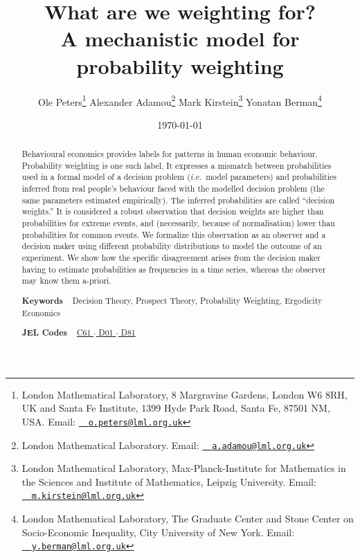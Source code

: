 \documentclass[a4paper, 12pt]{article}
\title{What are we weighting for? \\
{\small A mechanistic model for probability weighting}}
\author{
Ole Peters\footnote{London Mathematical Laboratory, 8 Margravine Gardens, London W6 8RH, UK and Santa Fe Institute, 1399 Hyde Park Road, Santa Fe, 87501 NM, USA. Email: \href{mailto:o.peters@lml.org.uk}{~\Letter~\texttt{o.peters@lml.org.uk}}} \;
Alexander Adamou\footnote{London Mathematical Laboratory. Email: \href{mailto:a.adamou@lml.org.uk}{~\Letter~\texttt{a.adamou@lml.org.uk}}} \;
Mark Kirstein\footnote{London Mathematical Laboratory, Max-Planck-Institute for Mathematics in the Sciences and Institute of Mathematics, Leipzig University. Email: \href{mailto:m.kirstein@lml.org.uk}{~\Letter~\texttt{m.kirstein@lml.org.uk}}} \;
Yonatan Berman\footnote{London Mathematical Laboratory, The Graduate Center and Stone Center on Socio-Economic Inequality, City University of New York. Email: \href{mailto:y.berman@lml.org.uk}{~\Letter~\texttt{y.berman@lml.org.uk}}} 
}
\date{\today}
\newcommand{\ie}{{\it i.e.}\ }
\begin{document}
\begin{titlepage}
	\maketitle
\thispagestyle{fancy}

\begin{abstract}
\noindent 
Behavioural economics provides labels for patterns in human economic behaviour. 
Probability weighting is one such label. It expresses a mismatch between probabilities used in a formal model of a decision problem (\ie model parameters) and probabilities inferred from real people's behaviour faced with the modelled decision problem (the same parameters estimated empirically). The inferred probabilities are called ``decision weights.'' 
It is considered a robust observation that decision weights are higher than probabilities for extreme events, and (necessarily, because of normalisation) lower than probabilities for common events. 
We formalize this observation as an observer and a decision maker using different probability distributions to model the outcome of an experiment.
We show how the specific disagreement arises from the decision maker having to estimate probabilities as frequencies in a time series, whereas the observer may know them a-priori. 
\vspace{1em}

\noindent\textsf{\textbf{Keywords}} ~ Decision Theory, Prospect Theory, Probability Weighting, Ergodicity Economics
\vspace{.5em}

\noindent\textsf{\textbf{JEL Codes}} ~
\href{https://www.aeaweb.org/econlit/jelCodes.php?view=jel#C}{%
C61		%
$\cdot$
}%
\href{https://www.aeaweb.org/econlit/jelCodes.php?view=jel#D}{%
D01 	%
$\cdot$
D81 	%
}
\end{abstract}
\end{titlepage}
 
\setcounter{page}{2}		%

 
\end{document}

